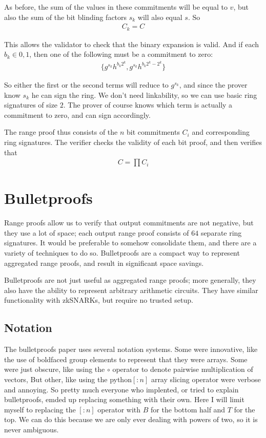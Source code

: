\documentclass{article}
\begin{document}
As before, the sum of the values in these commitments will be equal to $v$, but also the sum of the bit blinding factors $s_k$ will also equal $s$.  So
\begin{align}
  C_k = C
\end{align}

This allows the validator to check that the binary expansion is valid.  And if each $b_k \in {0, 1}$, then one of the following must be a commitment to zero:
\begin{align}
  \{g^{s_k} h^{b_k 2^k}, g^{s_k} h^{b_k 2^k - 2^k}\}
\end{align}

So either the first or the second terms will reduce to $g^{s_k}$, and since the prover know $s_k$ he can sign the ring.  We don't need linkability, so we can use basic ring signatures of size $2$. The prover of course knows which term is actually a commitment to zero, and can sign accordingly.

The range proof thus consists of the $n$ bit commitments $C_i$ and corresponding ring signatures.  The verifier checks the validity of each bit proof, and then verifies that
\begin{align}
  C = \prod{C_i}
\end{align}



\section{Bulletproofs}

Range proofs allow us to verify that output commitments are not negative, but they use a lot of space; each output range proof consists of $64$ separate ring signatures.  It would be preferable to somehow consolidate them, and there are a variety of techniques to do so.  Bulletproofs \cite{bulletproofs} are a compact way to represent aggregated range proofs, and result in significant space savings.

Bulletproofs are not just useful as aggregated range proofs; more generally, they also have the ability to represent arbitrary arithmetic circuits.  They have similar functionality with zkSNARKs, but require no trusted setup.

\subsection{Notation}

The bulletproofs paper uses several notation systems.  Some were innovative, like the use of boldfaced group elements to represent that they were arrays.  Some were just obscure, like using the $\circ$ operator to denote pairwise multiplication of vectors,  But other, like using the python$[:n]$ array slicing operator were verbose and annoying.  So pretty much everyone who implented, or tried to explain bulletproofs, emded up replacing something with their own.  Here I will limit myself to replacing the $[:n]$ operator with $B$ for the bottom half and $T$ for the top.  We can do this because we are only ever dealing with powers of two, so it is never ambiguous.
\end{document}
